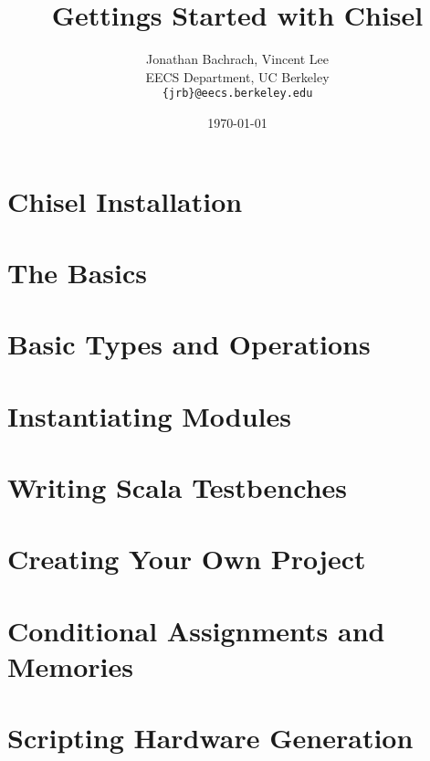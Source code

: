 \documentclass[twocolumn, 10pt]{book}
\title{Gettings Started with Chisel}
\author{Jonathan Bachrach, Vincent Lee \\
EECS Department, UC Berkeley\\
{\tt  \{jrb\}@eecs.berkeley.edu}
}
\date{\today}
\begin{document}
\maketitle{}

\chapter{Chisel Installation}


\chapter{The Basics}


\chapter{Basic Types and Operations}


\chapter{Instantiating Modules}


\chapter{Writing Scala Testbenches}


\chapter{Creating Your Own Project}


\chapter{Conditional Assignments and Memories}


\chapter{Scripting Hardware Generation}

\end{document}
